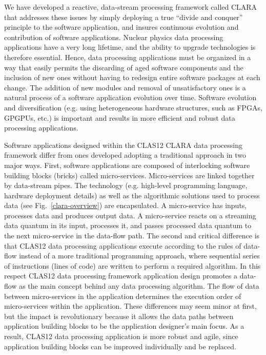 \documentclass[3p,times,twocolumn]{elsarticle}
\begin{document}
We have developed a reactive, data-stream processing framework called CLARA
\cite{clara-2011,clara-service,framework,clara-2016} that addresses these issues by simply deploying a true
“divide and conquer” principle to the software application, and insures continuous evolution and contribution of
software applications. Nuclear physics data processing applications have a very long lifetime, and the ability to
upgrade technologies is therefore essential. Hence, data processing applications must be organized in a way
that easily permits the discarding of aged software components and the inclusion of new ones without having to
redesign entire software packages at each change. The addition of new modules and removal of unsatisfactory
ones is a natural process of a software application evolution over time.  Software evolution and diversification
(e.g. using heterogeneous hardware structures, such as FPGAs, GPGPUs, etc.) is important and results in more
efficient and robust data processing applications.

Software applications designed within the CLAS12 CLARA data processing framework differ from ones developed adopting
a traditional approach in two major ways. First, software applications are composed of interlocking software building blocks
(bricks) called micro-services. Micro-services are linked together by data-stream pipes.  The technology
(e.g. high-level programming language, hardware deployment details) as well as the algorithmic solutions used to process
data (see Fig.~\ref{clara-overview}) are encapsulated. A micro-service has inputs, processes data and produces output data.
A micro-service reacts on a streaming data quantum in its input, processes it, and
passes processed data quantum to the next micro-service in the data-flow path. The second and critical difference is
that CLAS12 data processing applications execute according to the rules of data-flow instead of a more traditional
programming approach, where sequential series of instructions (lines of code) are written to perform a required algorithm.
In this respect CLAS12 data processing framework application design promotes a data-flow as the main concept
behind any data processing algorithm.   The flow of data between micro-services in the application determines
the execution order of micro-services within the application. These differences may seem minor at first, but
the impact is revolutionary because it allows the data paths between application building blocks to be the
application designer’s main focus. As a result, CLAS12 data processing application is more robust and agile, since
application building blocks can be improved individually and be replaced.
\end{document}
